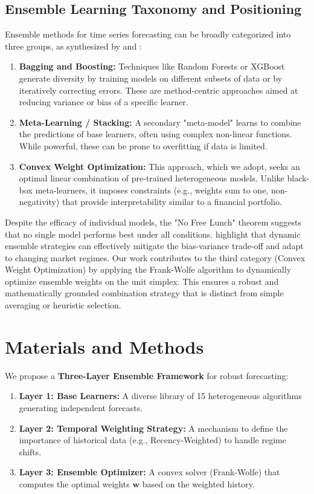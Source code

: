 \documentclass[journal,article,submit,pdftex,moreauthors]{Definitions/mdpi}
\begin{document}
\subsection{Ensemble Learning Taxonomy and Positioning}
Ensemble methods for time series forecasting can be broadly categorized into three groups, as synthesized by \citep{ref_wu_review} and \citep{ref_oliveira}:
\begin{enumerate}
    \item \textbf{Bagging and Boosting:} Techniques like Random Forests or XGBoost generate diversity by training models on different subsets of data or by iteratively correcting errors. These are method-centric approaches aimed at reducing variance or bias of a specific learner.
    \item \textbf{Meta-Learning / Stacking:} A secondary "meta-model" learns to combine the predictions of base learners, often using complex non-linear functions. While powerful, these can be prone to overfitting if data is limited.
    \item \textbf{Convex Weight Optimization:} This approach, which we adopt, seeks an optimal linear combination of pre-trained heterogeneous models. Unlike black-box meta-learners, it imposes constraints (e.g., weights sum to one, non-negativity) that provide interpretability similar to a financial portfolio.
\end{enumerate}

Despite the efficacy of individual models, the "No Free Lunch" theorem suggests that no single model performs best under all conditions. \citep{ref_mdpi_energies_2} highlight that dynamic ensemble strategies can effectively mitigate the bias-variance trade-off and adapt to changing market regimes. Our work contributes to the third category (Convex Weight Optimization) by applying the Frank-Wolfe algorithm to dynamically optimize ensemble weights on the unit simplex. This ensures a robust and mathematically grounded combination strategy that is distinct from simple averaging or heuristic selection.

\section{Materials and Methods}

We propose a \textbf{Three-Layer Ensemble Framework} for robust forecasting:
\begin{enumerate}
    \item \textbf{Layer 1: Base Learners:} A diverse library of 15 heterogeneous algorithms generating independent forecasts.
    \item \textbf{Layer 2: Temporal Weighting Strategy:} A mechanism to define the importance of historical data (e.g., Recency-Weighted) to handle regime shifts.
    \item \textbf{Layer 3: Ensemble Optimizer:} A convex solver (Frank-Wolfe) that computes the optimal weights $\mathbf{w}$ based on the weighted history.
\end{enumerate}
\end{document}
